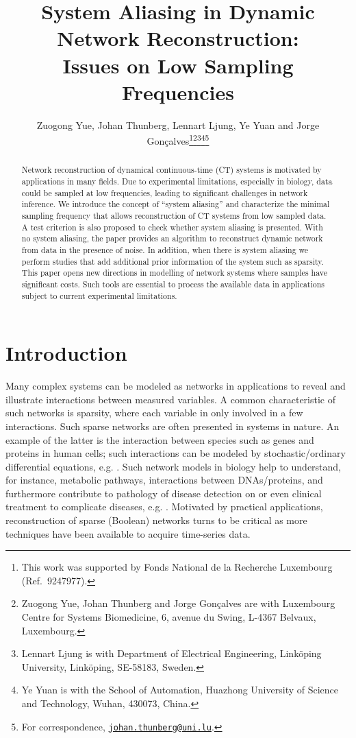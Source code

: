 \documentclass[letterpaper,10pt,journal,final]{IEEEtran}
\title{\LARGE \bf
  System Aliasing in Dynamic Network Reconstruction: \\Issues on Low Sampling Frequencies
}
\author{Zuogong Yue, Johan Thunberg, Lennart Ljung, Ye Yuan and Jorge Gon\c{c}alves\thanks{This work was supported by Fonds National de la Recherche Luxembourg (Ref.~9247977).}\thanks{ Zuogong Yue, Johan Thunberg and Jorge Gon\c{c}alves are with
    Luxembourg Centre for Systems Biomedicine,
    6, avenue du Swing, L-4367 Belvaux, Luxembourg.}\thanks{ Lennart Ljung is with Department of Electrical Engineering, Link\"oping University, Link\"oping, SE-58183, Sweden.}\thanks{ Ye Yuan is with the School of Automation, Huazhong University of Science and Technology, Wuhan, 430073, China.}\thanks{\hspace*{0mm}For correspondence, \href{mailto:johan.thunberg@uni.lu}{\tt johan.thunberg@uni.lu}.}}
\theoremstyle{definition}
\theoremstyle{remark}
\begin{document}
\maketitle
\thispagestyle{empty}
\pagestyle{empty}

\begin{abstract}
  Network reconstruction of dynamical continuous-time (CT) systems is motivated
  by applications in many fields. Due to experimental limitations, especially in
  biology, data could be sampled at low frequencies, leading to significant
  challenges in network inference. We introduce the concept of “system aliasing”
  and characterize the minimal sampling frequency that allows reconstruction of
  CT systems from low sampled data.  A test criterion is also proposed to check
  whether system aliasing is presented.  With no system aliasing, the paper
  provides an algorithm to reconstruct dynamic network from data in the presence
  of noise. In addition, when there is system aliasing we perform studies that
  add additional prior information of the system such as sparsity. This paper
  opens new directions in modelling of network systems where samples have
  significant costs. Such tools are essential to process the available data in
  applications subject to current experimental limitations.
\end{abstract}

\section{Introduction}

Many complex systems can be modeled as networks in applications to reveal and
illustrate interactions between measured variables. A common characteristic of
such networks is sparsity, where each variable in only involved in a few
interactions. Such sparse networks are often presented in systems in nature.  An
example of the latter is the interaction between species such as genes and
proteins in human cells; such interactions can be modeled by stochastic/ordinary
differential equations, e.g. \cite{palsson2011systems}.  Such network models in
biology help to understand, for instance, metabolic pathways, interactions
between DNAs/proteins, and furthermore contribute to pathology of disease
detection on or even clinical treatment to complicate diseases,
e.g. \cite{Bar-Joseph2012}.  Motivated by practical applications,
reconstruction of sparse (Boolean) networks turns to be critical as more
techniques have been available to acquire time-series data.
\end{document}
